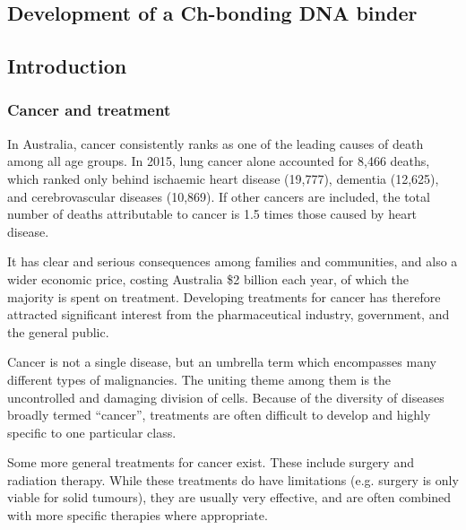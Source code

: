 \begin{refsection}

\chapter{Development of a Ch-bonding DNA binder}

\section{Introduction}

\subsection{Cancer and treatment}
In Australia, cancer consistently ranks as one of the leading causes of death among all age groups. In 2015, lung cancer alone accounted for 8,466 deaths, which ranked only behind ischaemic heart disease (19,777), dementia (12,625), and cerebrovascular diseases (10,869).
If other cancers are included, the total number of deaths attributable to cancer is 1.5 times those caused by heart disease\autocite{abs2015}.

It has clear and serious consequences among families and communities, and also a wider economic price, costing Australia \$2 billion each year, of which the majority is spent on treatment\autocite{Mathers1998}.
Developing treatments for cancer has therefore attracted significant interest from the pharmaceutical industry, government, and the general public\autocite{Rankin2015}.

Cancer is not a single disease, but an umbrella term which encompasses many different types of malignancies.
The uniting theme among them is the uncontrolled and damaging division of cells.
Because of the diversity of diseases broadly termed ``cancer'', treatments are often difficult to develop and highly specific to one particular class\autocite{Hanahan2011}.

Some more general treatments for cancer exist.
These include surgery and radiation therapy.
While these treatments do have limitations (e.g. surgery is only viable for solid tumours), they are usually very effective, and are often combined with more specific therapies where appropriate.



\end{refsection}
